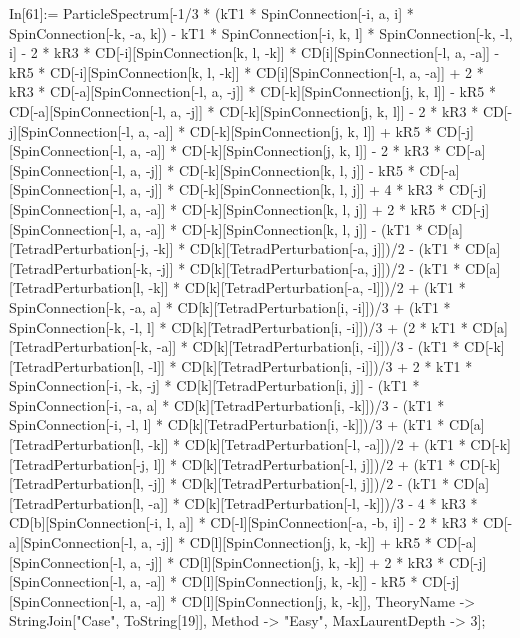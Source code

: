 In[61]:= ParticleSpectrum[-1/3 * (kT1 * SpinConnection[-i, a, i] * SpinConnection[-k, -a, k]) - kT1 * SpinConnection[-i, k, l] * SpinConnection[-k, -l, i] - 2 * kR3 * CD[-i][SpinConnection[k, l, -k]] * CD[i][SpinConnection[-l, a, -a]] - kR5 * CD[-i][SpinConnection[k, l, -k]] * CD[i][SpinConnection[-l, a, -a]] + 2 * kR3 * CD[-a][SpinConnection[-l, a, -j]] * CD[-k][SpinConnection[j, k, l]] - kR5 * CD[-a][SpinConnection[-l, a, -j]] * CD[-k][SpinConnection[j, k, l]] - 2 * kR3 * CD[-j][SpinConnection[-l, a, -a]] * CD[-k][SpinConnection[j, k, l]] + kR5 * CD[-j][SpinConnection[-l, a, -a]] * CD[-k][SpinConnection[j, k, l]] - 2 * kR3 * CD[-a][SpinConnection[-l, a, -j]] * CD[-k][SpinConnection[k, l, j]] - kR5 * CD[-a][SpinConnection[-l, a, -j]] * CD[-k][SpinConnection[k, l, j]] + 4 * kR3 * CD[-j][SpinConnection[-l, a, -a]] * CD[-k][SpinConnection[k, l, j]] + 2 * kR5 * CD[-j][SpinConnection[-l, a, -a]] * CD[-k][SpinConnection[k, l, j]] - (kT1 * CD[a][TetradPerturbation[-j, -k]] * CD[k][TetradPerturbation[-a, j]])/2 - (kT1 * CD[a][TetradPerturbation[-k, -j]] * CD[k][TetradPerturbation[-a, j]])/2 - (kT1 * CD[a][TetradPerturbation[l, -k]] * CD[k][TetradPerturbation[-a, -l]])/2 + (kT1 * SpinConnection[-k, -a, a] * CD[k][TetradPerturbation[i, -i]])/3 + (kT1 * SpinConnection[-k, -l, l] * CD[k][TetradPerturbation[i, -i]])/3 + (2 * kT1 * CD[a][TetradPerturbation[-k, -a]] * CD[k][TetradPerturbation[i, -i]])/3 - (kT1 * CD[-k][TetradPerturbation[l, -l]] * CD[k][TetradPerturbation[i, -i]])/3 + 2 * kT1 * SpinConnection[-i, -k, -j] * CD[k][TetradPerturbation[i, j]] - (kT1 * SpinConnection[-i, -a, a] * CD[k][TetradPerturbation[i, -k]])/3 - (kT1 * SpinConnection[-i, -l, l] * CD[k][TetradPerturbation[i, -k]])/3 + (kT1 * CD[a][TetradPerturbation[l, -k]] * CD[k][TetradPerturbation[-l, -a]])/2 + (kT1 * CD[-k][TetradPerturbation[-j, l]] * CD[k][TetradPerturbation[-l, j]])/2 + (kT1 * CD[-k][TetradPerturbation[l, -j]] * CD[k][TetradPerturbation[-l, j]])/2 - (kT1 * CD[a][TetradPerturbation[l, -a]] * CD[k][TetradPerturbation[-l, -k]])/3 - 4 * kR3 * CD[b][SpinConnection[-i, l, a]] * CD[-l][SpinConnection[-a, -b, i]] - 2 * kR3 * CD[-a][SpinConnection[-l, a, -j]] * CD[l][SpinConnection[j, k, -k]] + kR5 * CD[-a][SpinConnection[-l, a, -j]] * CD[l][SpinConnection[j, k, -k]] + 2 * kR3 * CD[-j][SpinConnection[-l, a, -a]] * CD[l][SpinConnection[j, k, -k]] - kR5 * CD[-j][SpinConnection[-l, a, -a]] * CD[l][SpinConnection[j, k, -k]], TheoryName -> StringJoin["Case", ToString[19]], Method -> "Easy", MaxLaurentDepth -> 3]; 